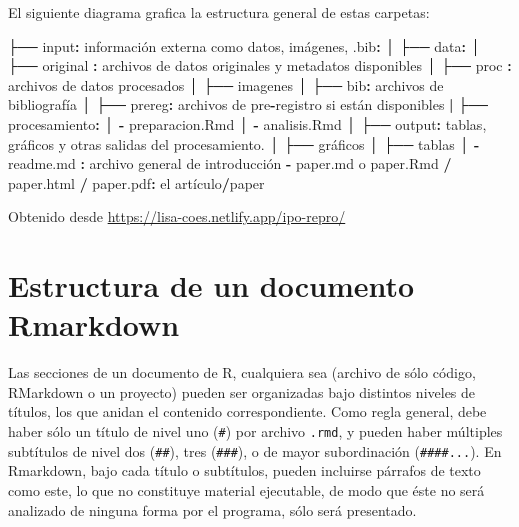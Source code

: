 \documentclass[
]{book}
\newenvironment{Shaded}{\begin{snugshade}}{\end{snugshade}}
\newcommand{\NormalTok}[1]{#1}
\newcommand{\SpecialCharTok}[1]{\textcolor[rgb]{0.81,0.36,0.00}{\textbf{#1}}}
\begin{document}
El siguiente diagrama grafica la estructura general de estas carpetas:

\begin{Shaded}
\begin{Highlighting}[]
\NormalTok{├── input}\SpecialCharTok{:}\NormalTok{ información externa como datos, imágenes, .bib}\SpecialCharTok{:}  
\NormalTok{│   ├── data}\SpecialCharTok{:}
\NormalTok{│     ├── original }\SpecialCharTok{:}\NormalTok{ archivos de datos originales y metadatos disponibles}
\NormalTok{│     ├── proc     }\SpecialCharTok{:}\NormalTok{ archivos de datos procesados}
\NormalTok{│   ├── imagenes}
\NormalTok{│   ├── bib}\SpecialCharTok{:}\NormalTok{ archivos de bibliografía}
\NormalTok{│   ├── prereg}\SpecialCharTok{:}\NormalTok{ archivos de pre}\SpecialCharTok{{-}}\NormalTok{registro si están disponibles}
\SpecialCharTok{|}
\NormalTok{├── procesamiento}\SpecialCharTok{:}
\NormalTok{│   }\SpecialCharTok{{-}}\NormalTok{ preparacion.Rmd}
\NormalTok{│   }\SpecialCharTok{{-}}\NormalTok{ analisis.Rmd}
\NormalTok{│}
\NormalTok{├── output}\SpecialCharTok{:}\NormalTok{ tablas, gráficos y otras salidas del procesamiento.}
\NormalTok{│   ├── gráficos}
\NormalTok{│   ├── tablas}
\NormalTok{│}
\SpecialCharTok{{-}}\NormalTok{ readme.md }\SpecialCharTok{:}\NormalTok{ archivo general de introducción}
\SpecialCharTok{{-}}\NormalTok{ paper.md o paper.Rmd }\SpecialCharTok{/}\NormalTok{ paper.html }\SpecialCharTok{/}\NormalTok{ paper.pdf}\SpecialCharTok{:}\NormalTok{ el artículo}\SpecialCharTok{/}\NormalTok{paper}
\end{Highlighting}
\end{Shaded}

Obtenido desde \url{https://lisa-coes.netlify.app/ipo-repro/}

\section{Estructura de un documento Rmarkdown}\label{estructura-de-un-documento-rmarkdown}

Las secciones de un documento de R, cualquiera sea (archivo de sólo código, RMarkdown o un proyecto) pueden ser organizadas bajo distintos niveles de títulos, los que anidan el contenido correspondiente. Como regla general, debe haber sólo un título de nivel uno (\texttt{\#}) por archivo \texttt{.rmd}, y pueden haber múltiples subtítulos de nivel dos (\texttt{\#\#}), tres (\texttt{\#\#\#}), o de mayor subordinación (\texttt{\#\#\#\#...}).
En Rmarkdown, bajo cada título o subtítulos, pueden incluirse párrafos de texto como este, lo que no constituye material ejecutable, de modo que éste no será analizado de ninguna forma por el programa, sólo será presentado.
\end{document}
